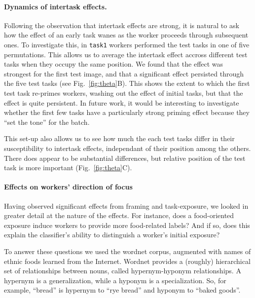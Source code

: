 \documentclass[12pt]{article}
\begin{document}
\paragraph{Dynamics of intertask effects.} Following the observation that
intertask effects are strong, it is natural to ask how the effect of an early
task wanes as the worker proceeds through subsequent ones.  To investigate
this, in \texttt{task1} workers performed the test tasks in one of five 
permutations.  This allows us to average the intertask effect accross different
test tasks when they occupy the same position.  We found that the effect was
strongest for the first test image, and that a significant effect persisted
through the five test tasks (see Fig.~\ref{fig:theta}B).  This shows the 
extent to which the first 
test task re-primes workers, washing out the effect of initial tasks, but that
the effect is quite persistent.  In future work, it would be interesting to
investigate whether the first few tasks have a particularly strong priming
effect because they ``set the tone'' for the batch.

This set-up also allows us to see how much the each test tasks differ in their 
susceptibility to intertask effects, independant of their position among the
others.  There does appear to be substantial differences, but relative
position of the test task is more important (Fig.~\ref{fig:theta}C).


\paragraph{Effects on workers' direction of focus} 

Having observed significant effects from framing and task-exposure,
we looked in greater detail at the nature of the effects.  For instance,
does a food-oriented exposure induce workers to provide more food-related
labels?  And if so, does this explain the classifier's ability to distinguish
a worker's initial exposure? 

To answer these questions we used the wordnet corpus, augmented with names of
ethnic foods learned from the Internet.  Wordnet provides a (roughly)
hierarchical set of relationships between nouns, called hypernym-hyponym
relationships.  A hypernym is a generalization, while a hyponym is a 
specialization.  So, for example, ``bread'' is hypernym to ``rye bread'' 
and hyponym to ``baked goods''.
\end{document}
